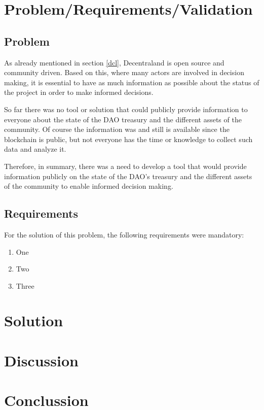 \documentclass[MSE,Master,english]{twbook}%
\begin{document}
\chapter{Problem/Requirements/Validation}
\section{Problem}
As already mentioned in section \ref{dcl}, Decentraland is open source and community driven. Based on this, where many actors are involved in decision making, it is essential to have as much information as possible about the status of the project in order to make informed decisions.

So far there was no tool or solution that could publicly provide information to everyone about the state of the DAO treasury and the different assets of the community. Of course the information was and still is available since the blockchain is public, but not everyone has the time or knowledge to collect such data and analyze it.

Therefore, in summary, there was a need to develop a tool that would provide information publicly on the state of the DAO's treasury and the different assets of the community to enable informed decision making.

\section{Requirements}
For the solution of this problem, the following requirements were mandatory:
\begin{enumerate}
  \item One
  \item Two
  \item Three
\end{enumerate}


\chapter{Solution}
\toComplete

\chapter{Discussion}
\toComplete

\chapter{Conclussion}
\toComplete
\end{document}
